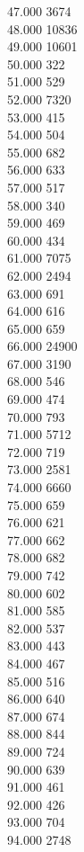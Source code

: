 { 47.000	3674 \\
 48.000	10836 \\
 49.000	10601 \\
 50.000	322 \\
 51.000	529 \\
 52.000	7320 \\
 53.000	415 \\
 54.000	504 \\
 55.000	682 \\
 56.000	633 \\
 57.000	517 \\
 58.000	340 \\
 59.000	469 \\
 60.000	434 \\
 61.000	7075 \\
 62.000	2494 \\
 63.000	691 \\
 64.000	616 \\
 65.000	659 \\
 66.000	24900 \\
 67.000	3190 \\
 68.000	546 \\
 69.000	474 \\
 70.000	793 \\
 71.000	5712 \\
 72.000	719 \\
 73.000	2581 \\
 74.000	6660 \\
 75.000	659 \\
 76.000	621 \\
 77.000	662 \\
 78.000	682 \\
 79.000	742 \\
 80.000	602 \\
 81.000	585 \\
 82.000	537 \\
 83.000	443 \\
 84.000	467 \\
 85.000	516 \\
 86.000	640 \\
 87.000	674 \\
 88.000	844 \\
 89.000	724 \\
 90.000	639 \\
 91.000	461 \\
 92.000	426 \\
 93.000	704 \\
 94.000	2748 \\
}
